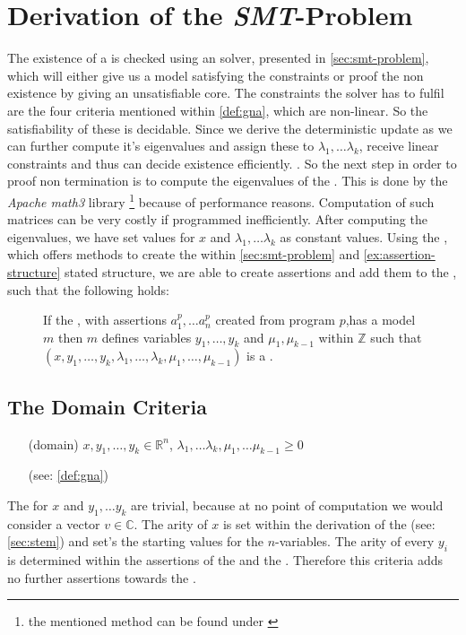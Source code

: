 \section{Derivation of the \emph{SMT}-Problem}
\label{sec:derivation-smt}
The existence of a \gna is checked using an  solver, presented in \autoref{sec:smt-problem}, which will either give us a model satisfying the constraints or proof the non existence by giving an unsatisfiable core. \newline
The constraints the  solver has to fulfil are the four criteria mentioned within \autoref{def:gna}, which are non-linear. So the satisfiability of these is decidable. Since we derive the deterministic update as \updatematrix we can further compute it's eigenvalues and assign these to $\lambda_1, \dots \lambda_k$, receive linear constraints and thus can decide existence efficiently. \cite{leike2014geometric}.%
\newline
So the next step in order to proof non termination is to compute the eigenvalues of the \updatematrix. This is done by the \textit{Apache math3} library \footnote{the mentioned method can be found under \cite{ApacheMath3}}  because of performance reasons. Computation of such matrices can be very costly if programmed inefficiently. %
After computing the eigenvalues, we have set values for $x$ and $\lambda_1, \dots \lambda_k$ as constant values.
\newline
Using the \smtfactory, which offers methods to create the within \autoref{sec:smt-problem} and \autoref{ex:assertion-structure} stated structure, we are able to create assertions and add them to the \solver, such that the following holds:
\begin{figure}[H]
	\centering
	If the \solver, with assertions $a^p_1, \dots a^p_n$ created from program $p$,has a model $m$ \newline
	then $m$ defines variables $y_1, \dots, y_k$ and $\mu_1, \mu_{k-1}$ within $\mathbb{Z}$ such that \newline
	$(x, y_1, \dots, y_k, \lambda_1, \dots, \lambda_k, \mu_1, \dots, \mu_{k-1})$ is a \gna.
\end{figure}

\subsection{The Domain Criteria}
\begin{itemize}
	\setlength{\itemindent}{1in}
	\item[(domain)] $x, y_1, \dots, y_k \in \mathbb{R}^n$, $\lambda_1, \dots \lambda_k, \mu_1, \dots \mu_{k-1} \ge 0$
	\item[] (see: \autoref{def:gna})
\end{itemize}
The \domc for $x$ and $y_1, \dots y_k$ are trivial, because at no point of computation we would consider a vector $v\in\mathbb{C}$.
The arity of $x$ is set within the derivation of the \stem (see: \autoref{sec:stem}) and set's the starting values for the $n$-variables. The arity of every $y_i$ is determined within the assertions of the \pointc and the \rayc.\newline
Therefore this criteria adds no further assertions towards the \solver.
